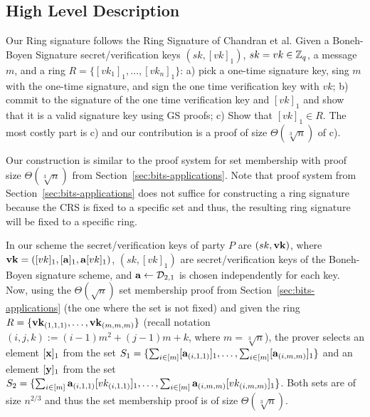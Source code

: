 \subsection{High Level Description}

Our Ring signature follows the Ring Signature of Chandran et al. Given a Boneh-Boyen Signature secret/verification keys $(sk,[vk]_1)$, $sk=vk\in\mathbb{Z}_q$, a message $m$, and a ring $R=\{[vk_1]_1,\ldots,[vk_n]_1\}$: a) pick a one-time signature key, sing $m$ with the one-time signature, and sign the one time verification key with $vk$; b) commit to the signature of the one time verification key and $[vk]_1$ and show that it is a valid signature key using GS proofs; c) Show that $[vk]_1\in R$. The most costly part is c) and our contribution is a proof of size $\Theta(\sqrt[3]{n})$ of c).

Our construction is similar to the proof system for set membership with proof size $\Theta(\sqrt[3]{n})$ from Section~\ref{sec:bits-applications}. Note that proof system from Section~\ref{sec:bits-applications} does not suffice for constructing a ring signature because the CRS is fixed to a specific set and thus, the resulting ring signature will be fixed to a specific ring. 



In our scheme the secret/verification keys of party $P$ are $(sk,\mathbf{vk})$, where $\mathbf{vk}=([vk]_1,[\mathbf{a}]_1,\mathbf{a}[vk]_1)$, $(sk,[vk]_1)$ are secret/verification keys of the Boneh-Boyen signature scheme, and $\mathbf{a}\gets\mathcal{D}_{2,1}$ is chosen independently for each key. Now, using the $\Theta(\sqrt{n})$ set membership proof from Section~\ref{sec:bits-applications} (the one where the set is not fixed) and given the ring $R=\{\mathbf{vk}_{(1,1,1)},\ldots,\mathbf{vk}_{(m,m,m)}\}$ (recall notation $(i,j,k):=(i-1)m^2+(j-1)m+k$, where $m=\sqrt[3]{n}$), the prover selects an element $[\mathbf{x}]_1$ from the set $S_1=\{\sum_{i\in[m]}[\mathbf{a}_{(i,1,1)}]_1,\ldots,\sum_{i\in[m]}[\mathbf{a}_{(i,m,m)}]_1\}$ and an element $[\mathbf{y}]_1$ from the set $S_2=\{\sum_{i\in[m]}\mathbf{a}_{(i,1,1)}[vk_{(i,1,1)}]_1,\ldots,\sum_{i\in[m]}\mathbf{a}_{(i,m,m)}[vk_{(i,m,m)}]_1\}$. Both sets are of size $n^{2/3}$ and thus the set membership proof is of size $\Theta(\sqrt[3]{n})$.

